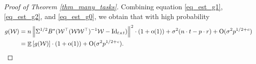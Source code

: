 \begin{proof}[Proof of Theorem \ref{thm_many_tasks}]
	Combining equation \eqref{eq_est_g1}, \eqref{eq_est_g2}, and \eqref{eq_est_g0}, we obtain that with high probability
	\begin{align}
	g(\mathcal W)&= n \left\| \Sigma^{1/2} B^{\star} ({\mathcal W}^{\top} ({\mathcal W} {\mathcal W}^{\top})^{-1} {\mathcal W} - \operatorname{Id}_{t\times t}) \right\|^2 \cdot (1+\operatorname{o}(1)) + \sigma^2 (n\cdot t - p \cdot r)+\operatorname{O}(\sigma^2 p^{1/2+{\mathit{c}}}) \nonumber \\
	&=\mathop{\mathbb{E}}\left[ g({\mathcal W}) \right] \cdot (1+\operatorname{o}(1)) + \operatorname{O}(\sigma^2 p^{1/2+{\mathit{c}}}). \label{eq_est_g}
	\end{align}





\end{proof}
